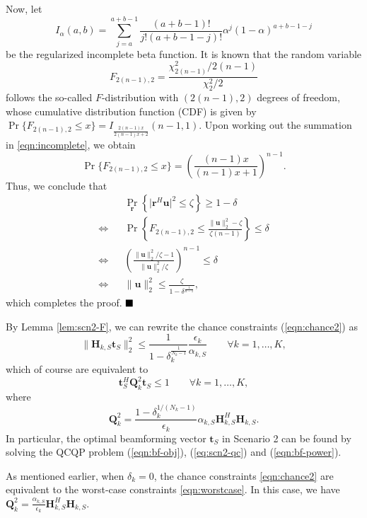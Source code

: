 \documentclass[twocolumn,10pt]{IEEEtran}
\theoremstyle{plain} \newtheorem{theorem}{Theorem}
\theoremstyle{plain} \newtheorem{proposition}{Proposition}
\theoremstyle{plain} \newtheorem{corollary}{Corollary}
\theoremstyle{remark} \newtheorem{remark}{Remark}
\theoremstyle{remark} \newtheorem{lemma}{Lemma}
\theoremstyle{plain} \newtheorem{definition}{Definition}
\theoremstyle{plain} \newtheorem{assumption}{Assumption}
\theoremstyle{plain} \newtheorem{fact}{Fact}
\begin{document}
Now, let
\begin{equation}\label{eqn:incomplete}
I_\alpha(a,b)=\sum_{j=a}^{a+b-1}\frac{(a+b-1)!}{j!(a+b-1-j)!}\alpha^j(1-\alpha)^{a+b-1-j}
\end{equation}
be the regularized incomplete beta function.  It is known that the random variable
$$ F_{2(n-1),2} = \frac{\chi_{2(n-1)}^2/2(n-1)}{\chi_2^2/2} $$
follows the so-called $F$-distribution with $(2(n-1),2)$ degrees of freedom, whose cumulative distribution function (CDF) is given by $\Pr\{F_{2(n-1),2}\leq x\}=I_{\frac{2(n-1)x}{2(n-1)x+2}}(n-1,1)$.  Upon working out the summation in \eqref{eqn:incomplete}, we obtain
$$ \Pr\{F_{2(n-1),2}\leq x\}=\left(\frac{(n-1)x}{(n-1)x+1}\right)^{n-1}. $$
Thus, we conclude that
\begin{eqnarray*}
&&\Pr_{\mathbf{r}}\left\{\big| \mathbf{r}^H \mathbf{u}\big|^2 \leq \zeta\right\}\geq 1-\delta\\
\Longleftrightarrow &&\Pr\left\{F_{2(n-1),2}\leq\frac{\|\mathbf{u}\|_2^2-\zeta}{\zeta(n-1)}\right\}\leq \delta \\
\Longleftrightarrow && \left(\frac{\|\mathbf{u}\|_2^2/\zeta-1}{\|\mathbf{u}\|_2^2/\zeta}\right)^{n-1} \leq \delta\\
\Longleftrightarrow && \|\mathbf{u}\|_2^2\leq \frac{\zeta}{1-\delta^{\frac{1}{n-1}}},
\end{eqnarray*}
which completes the proof.
$\hfill\blacksquare$

By Lemma \ref{lem:scn2-F}, we can rewrite the chance constraints (\ref{eqn:chance2}) as
$$
   \|\mathbf{H}_{k,S}\mathbf{t}_S\|_2^2\leq \frac{1}{1-\delta_k^{\frac{1}{N_k-1}}}\frac{\epsilon_k}{\alpha_{k,S}} \qquad\forall k=1,\ldots, K,
$$
which of course are equivalent to
\begin{equation} \label{eq:scn2-qc}
   \mathbf{t}_S^H\mathbf{Q}_k^2\mathbf{t}_S \leq 1 \qquad\forall k=1,\ldots,K, \end{equation}
where
$$ \mathbf{Q}_k^2=\frac{1-\delta_k^{1/(N_k-1)}}{\epsilon_k}\alpha_{k,S}\mathbf{H}_{k,S}^H\mathbf{H}_{k,S}. $$
In particular, the optimal beamforming vector $\mathbf{t}_S$ in Scenario 2 can be found by solving the QCQP problem (\ref{eqn:bf-obj}), (\ref{eq:scn2-qc}) and (\ref{eqn:bf-power}).

As mentioned earlier, when $\delta_k=0$, the chance constraints \eqref{eqn:chance2} are equivalent to the worst-case constraints \eqref{eqn:worstcase}. In this case, we have $\mathbf{Q}_k^2=\frac{\alpha_{k,S}}{\epsilon_k}\mathbf{H}_{k,S}^H\mathbf{H}_{k,S}$.
\end{document}

